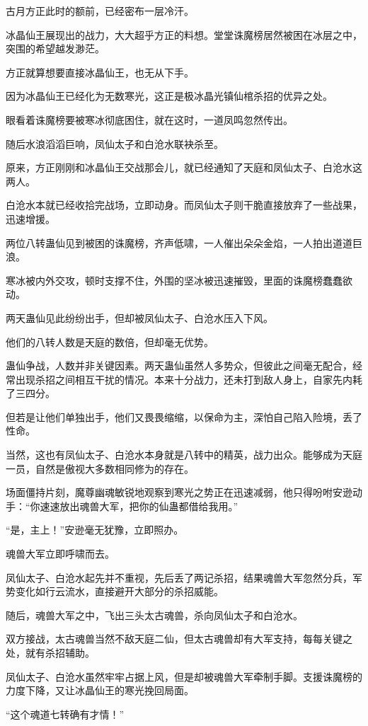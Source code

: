 \begin{this_body}
古月方正此时的额前，已经密布一层冷汗。

冰晶仙王展现出的战力，大大超乎方正的料想。堂堂诛魔榜居然被困在冰层之中，突围的希望越发渺茫。

方正就算想要直接冰晶仙王，也无从下手。

因为冰晶仙王已经化为无数寒光，这正是极冰晶光镇仙棺杀招的优异之处。

眼看着诛魔榜要被寒冰彻底困住，就在这时，一道凤鸣忽然传出。

随后水浪滔滔巨响，凤仙太子和白沧水联袂杀至。

原来，方正刚刚和冰晶仙王交战那会儿，就已经通知了天庭和凤仙太子、白沧水这两人。

白沧水本就已经收拾完战场，立即动身。而凤仙太子则干脆直接放弃了一些战果，迅速增援。

两位八转蛊仙见到被困的诛魔榜，齐声低啸，一人催出朵朵金焰，一人拍出道道巨浪。

寒冰被内外交攻，顿时支撑不住，外围的坚冰被迅速摧毁，里面的诛魔榜蠢蠢欲动。

两天蛊仙见此纷纷出手，但却被凤仙太子、白沧水压入下风。

他们的八转人数是天庭的数倍，但却毫无优势。

蛊仙争战，人数并非关键因素。两天蛊仙虽然人多势众，但彼此之间毫无配合，经常出现杀招之间相互干扰的情况。本来十分战力，还未打到敌人身上，自家先内耗了三四分。

但若是让他们单独出手，他们又畏畏缩缩，以保命为主，深怕自己陷入险境，丢了性命。

当然，这也有凤仙太子、白沧水本身就是八转中的精英，战力出众。能够成为天庭一员，自然是傲视大多数相同修为的存在。

场面僵持片刻，魔尊幽魂敏锐地观察到寒光之势正在迅速减弱，他只得吩咐安逊动手：“你速速放出魂兽大军，把你的仙蛊都借给我用。”

“是，主上！”安逊毫无犹豫，立即照办。

魂兽大军立即呼啸而去。

凤仙太子、白沧水起先并不重视，先后丢了两记杀招，结果魂兽大军忽然分兵，军势变化如行云流水，直接避开大部分的杀招威能。

随后，魂兽大军之中，飞出三头太古魂兽，杀向凤仙太子和白沧水。

双方接战，太古魂兽当然不敌天庭二仙，但太古魂兽却有大军支持，每每关键之处，就有杀招辅助。

凤仙太子、白沧水虽然牢牢占据上风，但是却被魂兽大军牵制手脚。支援诛魔榜的力度下降，又让冰晶仙王的寒光挽回局面。

“这个魂道七转确有才情！”


\end{this_body}
